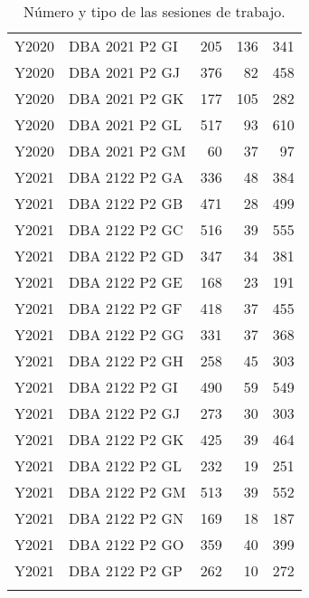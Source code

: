 \begin{longtable}{llrrr}
Y2020 & DBA 2021 P2 GI &   205 &     136 &  341 \\
Y2020 & DBA 2021 P2 GJ &   376 &      82 &  458 \\
Y2020 & DBA 2021 P2 GK &   177 &     105 &  282 \\
Y2020 & DBA 2021 P2 GL &   517 &      93 &  610 \\
Y2020 & DBA 2021 P2 GM &    60 &      37 &   97 \\
Y2021 & DBA 2122 P2 GA &   336 &      48 &  384 \\
Y2021 & DBA 2122 P2 GB &   471 &      28 &  499 \\
Y2021 & DBA 2122 P2 GC &   516 &      39 &  555 \\
Y2021 & DBA 2122 P2 GD &   347 &      34 &  381 \\
Y2021 & DBA 2122 P2 GE &   168 &      23 &  191 \\
Y2021 & DBA 2122 P2 GF &   418 &      37 &  455 \\
Y2021 & DBA 2122 P2 GG &   331 &      37 &  368 \\
Y2021 & DBA 2122 P2 GH &   258 &      45 &  303 \\
Y2021 & DBA 2122 P2 GI &   490 &      59 &  549 \\
Y2021 & DBA 2122 P2 GJ &   273 &      30 &  303 \\
Y2021 & DBA 2122 P2 GK &   425 &      39 &  464 \\
Y2021 & DBA 2122 P2 GL &   232 &      19 &  251 \\
Y2021 & DBA 2122 P2 GM &   513 &      39 &  552 \\
Y2021 & DBA 2122 P2 GN &   169 &      18 &  187 \\
Y2021 & DBA 2122 P2 GO &   359 &      40 &  399 \\
Y2021 & DBA 2122 P2 GP &   262 &      10 &  272 \\
\hline
\caption{Número y tipo de las sesiones de trabajo.}
\label{tab:type}
\end{longtable}